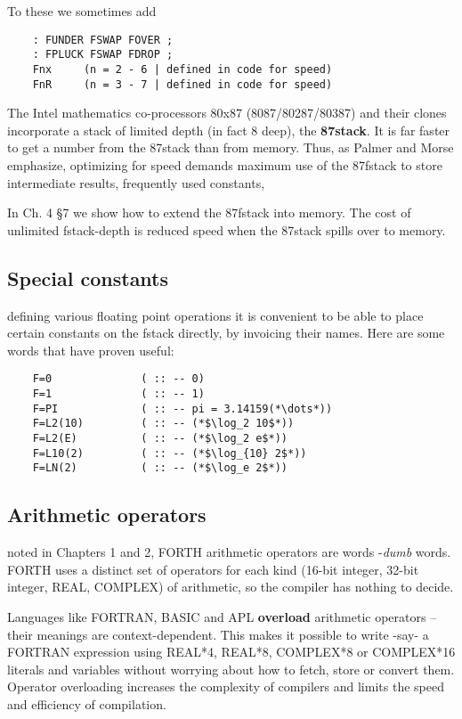 To these we sometimes add

\begin{lstlisting}
    : FUNDER FSWAP FOVER ;
    : FPLUCK FSWAP FDROP ;
    Fnx     (n = 2 - 6 | defined in code for speed)
    FnR     (n = 3 - 7 | defined in code for speed)
\end{lstlisting}

The Intel mathematics co-processors 80x87 (8087/80287/80387)
and their clones incorporate a stack of limited depth (in fact 8
deep), the \textbf{87stack}. It is far faster to get a number from the 87stack
than from memory. Thus, as Palmer and Morse emphasize,
optimizing for speed demands maximum use of the 87fstack to store intermediate
results, frequently used constants, \etc

In Ch. 4 \S7 we show how to extend the 87fstack into memory. The
cost of unlimited fstack-depth is reduced speed when the 87stack
spills over to memory.

\subsection{Special constants}
 defining various floating point operations it is convenient to be
able to place certain constants on the fstack directly, by invoicing
their names. Here are some words that have proven useful:
\begin{lstlisting}
    F=0              ( :: -- 0)
    F=1              ( :: -- 1)
    F=PI             ( :: -- pi = 3.14159(*\dots*))
    F=L2(10)         ( :: -- (*$\log_2 10$*))
    F=L2(E)          ( :: -- (*$\log_2 e$*))
    F=L10(2)         ( :: -- (*$\log_{10} 2$*))
    F=LN(2)          ( :: -- (*$\log_e 2$*))
\end{lstlisting}
 
\subsection{Arithmetic operators}
noted in Chapters 1 and 2, FORTH arithmetic operators are words -\textit{dumb} words. FORTH uses a distinct set of operators for each kind (16-bit integer, 32-bit integer, REAL, COMPLEX) of arithmetic, so the compiler has nothing to decide.

Languages like FORTRAN, BASIC and APL \textbf{overload} arithmetic operators -- their meanings are context-dependent. This makes it possible to write -say- a FORTRAN expression using REAL*4, REAL*8, COMPLEX*8 or COMPLEX*16 literals and variables without worrying about how to fetch, store or convert them. Operator overloading increases the complexity of compilers and limits the speed and efficiency of compilation.

